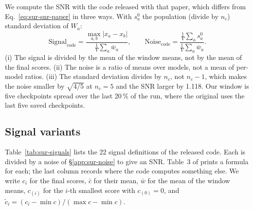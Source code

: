 We compute the SNR with the code released with that paper, which differs from Eq.~\ref{eq:sur-snr-paper} in three ways.
With $s^{0}_a$ the population (divide by $n_c$) standard deviation of $W_a$:
\begin{equation}
\text{Signal}_{\text{code}} = \frac{\max_{a,b} |x_a - x_b|}{\frac{1}{V}\sum_a \bar{w}_a}, \qquad
\text{Noise}_{\text{code}} = \frac{\frac{1}{V}\sum_a s^{0}_a}{\frac{1}{V}\sum_a \bar{w}_a}.
\label{eq:sur-snr-code}
\end{equation}
(i) The signal is divided by the mean of the window means, not by the mean of the final scores.
(ii) The noise is a ratio of means over models, not a mean of per-model ratios.
(iii) The standard deviation divides by $n_c$, not $n_c - 1$, which makes the noise smaller by $\sqrt{4/5}$ at $n_c = 5$ and the SNR larger by 1.118.
Our window is five checkpoints spread over the last 20\,\% of the run, where the original uses the last five saved checkpoints.

\subsection{Signal variants}
\label{app:sur-signals}

Table~\ref{tab:sur-signals} lists the 22 signal definitions of the released code.
Each is divided by a noise of \S\ref{app:sur-noise} to give an SNR.
Table~3 of \citet{heineman_signal_2025} prints a formula for each; the last column records where the code computes something else.
We write $c_i$ for the final scores, $\bar{c}$ for their mean, $\bar{w}$ for the mean of the window means, $c_{(i)}$ for the $i$-th smallest score with $c_{(0)} = 0$, and $\tilde{c}_i = (c_i - \min c)/(\max c - \min c)$.

